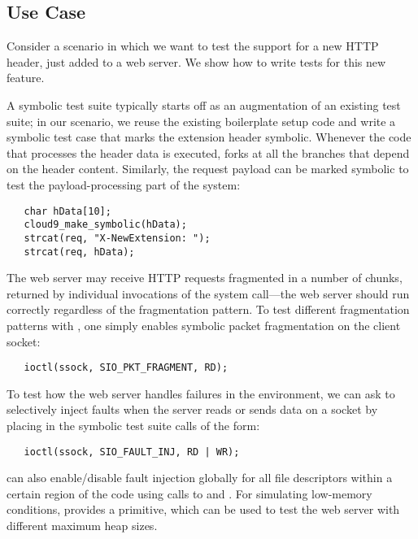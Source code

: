 \subsection{Use Case}

Consider a scenario in which we want to test the support for a new  HTTP header, just added to a web server. We show how to write tests for this new feature.

A symbolic test suite typically starts off as an augmentation of an existing test suite; in our scenario, we reuse the existing boilerplate setup code and write a symbolic test case that marks the extension header symbolic. Whenever the code that processes the header data is executed, \cnine forks at all the branches that depend on the header content. Similarly, the request payload can be marked symbolic to test the payload-processing part of the system:

\begin{verbatim}
   char hData[10];
   cloud9_make_symbolic(hData);
   strcat(req, "X-NewExtension: ");
   strcat(req, hData);
\end{verbatim}

The web server may receive HTTP requests fragmented in a number of chunks, returned by individual invocations of the  system call---the web server should run correctly regardless of the fragmentation pattern.  To test different fragmentation patterns with \cnine, one simply enables symbolic packet fragmentation on the client socket:
\begin{verbatim}
   ioctl(ssock, SIO_PKT_FRAGMENT, RD);
\end{verbatim}

To test how the web server handles failures in the environment, we can ask \cnine to selectively inject faults when the server reads or sends data on a socket by placing in the symbolic test suite calls of the form:
\begin{verbatim}
   ioctl(ssock, SIO_FAULT_INJ, RD | WR);
\end{verbatim}
\cnine can also enable/disable fault injection globally for all file descriptors within a certain region of the code using calls to  and . For simulating low-memory conditions, \cnine provides a  primitive, which can be used to test the web server with different maximum heap sizes.

